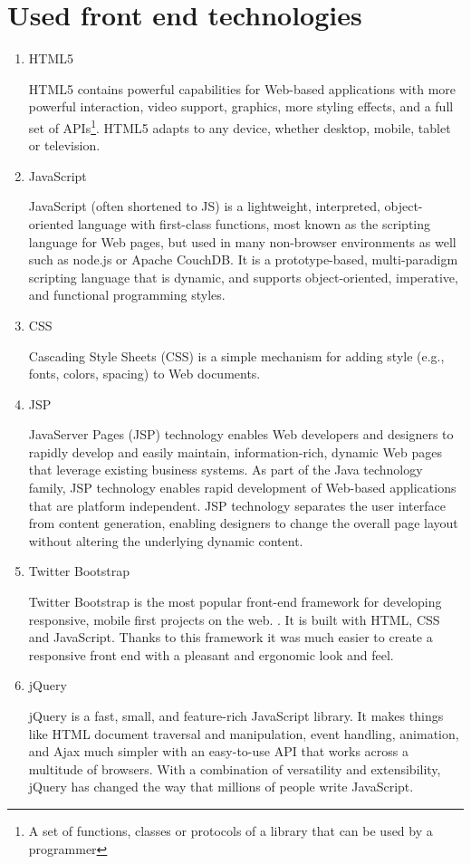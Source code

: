 \documentclass[thesis=B,english]{FITthesis}[2012/10/20]
\begin{document}
\section{Used front end technologies}
\begin{enumerate}

\item{HTML5}

HTML5 contains powerful capabilities for Web-based applications with more powerful interaction, video support, graphics, more styling effects, and a full set of APIs\footnote{A set of functions, classes or protocols of a library that can be used by a programmer}. HTML5 adapts to any device, whether desktop, mobile, tablet or television.\cite{html}

\item{JavaScript}

JavaScript (often shortened to JS) is a lightweight, interpreted, object-oriented language with first-class functions, most known as the scripting language for Web pages, but used in many non-browser environments as well such as node.js or Apache CouchDB. It is a prototype-based, multi-paradigm scripting language that is dynamic, and supports object-oriented, imperative, and functional programming styles.\cite{javascript}

\item{CSS}

Cascading Style Sheets (CSS) is a simple mechanism for adding style (e.g., fonts, colors, spacing) to Web documents.\cite{css}

\item{JSP}

JavaServer Pages (JSP) technology enables Web developers and designers to rapidly develop and easily maintain, information-rich, dynamic Web pages that leverage existing business systems. As part of the Java technology family, JSP technology enables rapid development of Web-based applications that are platform independent. JSP technology separates the user interface from content generation, enabling designers to change the overall page layout without altering the underlying dynamic content.\cite{jsp}

\item{Twitter Bootstrap}

Twitter Bootstrap is the most popular front-end framework for developing responsive, mobile first projects on the web. \cite{bootstrap}. It is built with HTML, CSS and JavaScript. Thanks to this framework it was much easier to create a responsive front end with a pleasant and ergonomic look and feel.

\item{jQuery}

jQuery is a fast, small, and feature-rich JavaScript library. It makes things like HTML document traversal and manipulation, event handling, animation, and Ajax much simpler with an easy-to-use API that works across a multitude of browsers. With a combination of versatility and extensibility, jQuery has changed the way that millions of people write JavaScript.\cite{jQuery}

\end{enumerate}
\end{document}
